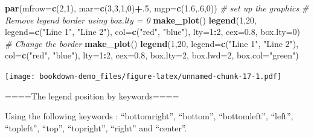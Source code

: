 \documentclass[]{book}
\newenvironment{Shaded}{\begin{snugshade}}{\end{snugshade}}
\newcommand{\KeywordTok}[1]{\textcolor[rgb]{0.13,0.29,0.53}{\textbf{#1}}}
\newcommand{\DataTypeTok}[1]{\textcolor[rgb]{0.13,0.29,0.53}{#1}}
\newcommand{\DecValTok}[1]{\textcolor[rgb]{0.00,0.00,0.81}{#1}}
\newcommand{\FloatTok}[1]{\textcolor[rgb]{0.00,0.00,0.81}{#1}}
\newcommand{\StringTok}[1]{\textcolor[rgb]{0.31,0.60,0.02}{#1}}
\newcommand{\CommentTok}[1]{\textcolor[rgb]{0.56,0.35,0.01}{\textit{#1}}}
\newcommand{\OperatorTok}[1]{\textcolor[rgb]{0.81,0.36,0.00}{\textbf{#1}}}
\newcommand{\NormalTok}[1]{#1}
\begin{document}
\begin{Shaded}
\begin{Highlighting}[]
\KeywordTok{par}\NormalTok{(}\DataTypeTok{mfrow=}\KeywordTok{c}\NormalTok{(}\DecValTok{2}\NormalTok{,}\DecValTok{1}\NormalTok{), }\DataTypeTok{mar=}\KeywordTok{c}\NormalTok{(}\DecValTok{3}\NormalTok{,}\DecValTok{3}\NormalTok{,}\DecValTok{1}\NormalTok{,}\DecValTok{0}\NormalTok{)}\OperatorTok{+}\NormalTok{.}\DecValTok{5}\NormalTok{, }\DataTypeTok{mgp=}\KeywordTok{c}\NormalTok{(}\FloatTok{1.6}\NormalTok{,.}\DecValTok{6}\NormalTok{,}\DecValTok{0}\NormalTok{))  }\CommentTok{# set up the graphics}
\CommentTok{# Remove legend border using box.lty = 0}
\KeywordTok{make_plot}\NormalTok{()}
\KeywordTok{legend}\NormalTok{(}\DecValTok{1}\NormalTok{,}\DecValTok{20}\NormalTok{, }\DataTypeTok{legend=}\KeywordTok{c}\NormalTok{(}\StringTok{"Line 1"}\NormalTok{, }\StringTok{"Line 2"}\NormalTok{),}
       \DataTypeTok{col=}\KeywordTok{c}\NormalTok{(}\StringTok{"red"}\NormalTok{, }\StringTok{"blue"}\NormalTok{), }\DataTypeTok{lty=}\DecValTok{1}\OperatorTok{:}\DecValTok{2}\NormalTok{, }\DataTypeTok{cex=}\FloatTok{0.8}\NormalTok{,}
       \DataTypeTok{box.lty=}\DecValTok{0}\NormalTok{)}
\CommentTok{# Change the border}
\KeywordTok{make_plot}\NormalTok{()}
\KeywordTok{legend}\NormalTok{(}\DecValTok{1}\NormalTok{,}\DecValTok{20}\NormalTok{, }\DataTypeTok{legend=}\KeywordTok{c}\NormalTok{(}\StringTok{"Line 1"}\NormalTok{, }\StringTok{"Line 2"}\NormalTok{),}
       \DataTypeTok{col=}\KeywordTok{c}\NormalTok{(}\StringTok{"red"}\NormalTok{, }\StringTok{"blue"}\NormalTok{), }\DataTypeTok{lty=}\DecValTok{1}\OperatorTok{:}\DecValTok{2}\NormalTok{, }\DataTypeTok{cex=}\FloatTok{0.8}\NormalTok{,}
       \DataTypeTok{box.lty=}\DecValTok{2}\NormalTok{, }\DataTypeTok{box.lwd=}\DecValTok{2}\NormalTok{, }\DataTypeTok{box.col=}\StringTok{"green"}\NormalTok{)}
\end{Highlighting}
\end{Shaded}

\texttt{[image: bookdown-demo\_files/figure-latex/unnamed-chunk-17-1.pdf]}

====The legend position by keywords====

Using the following keywords : ``bottomright'', ``bottom'',
``bottomleft'', ``left'', ``topleft'', ``top'', ``topright'', ``right''
and ``center''.
\end{document}
